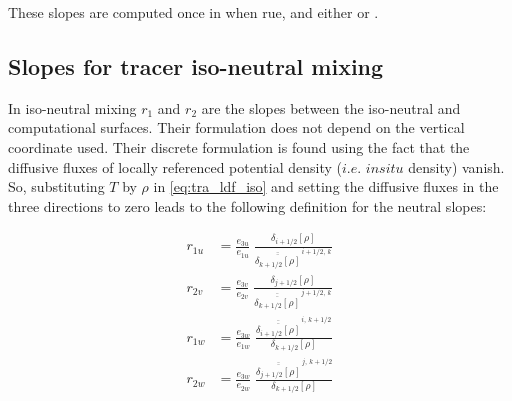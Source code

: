 \documentclass[../tex_main/NEMO_manual]{subfiles}
\begin{document}

These slopes are computed once in  when rue,
and either  or . 

\subsection{Slopes for tracer iso-neutral mixing}
\label{subsec:LDF_slp_iso}
In iso-neutral mixing  $r_1$ and $r_2$ are the slopes between the iso-neutral and computational surfaces.
Their formulation does not depend on the vertical coordinate used.
Their discrete formulation is found using the fact that the diffusive fluxes of
locally referenced potential density ($i.e.$ $in situ$ density) vanish.
So, substituting $T$ by $\rho$ in \autoref{eq:tra_ldf_iso} and setting the diffusive fluxes in
the three directions to zero leads to the following definition for the neutral slopes:

\begin{equation} \label{eq:ldfslp_iso}
\begin{split}
 r_{1u} &= \frac{e_{3u}}{e_{1u}}\; \frac{\delta_{i+1/2}[\rho]}
 								{\overline{\overline{\delta_{k+1/2}[\rho]}}^{\,i+1/2,\,k}}
\\
 r_{2v} &= \frac{e_{3v}}{e_{2v}}\; \frac{\delta_{j+1/2}\left[\rho \right]}
 								{\overline{\overline{\delta_{k+1/2}[\rho]}}^{\,j+1/2,\,k}}
\\
 r_{1w} &= \frac{e_{3w}}{e_{1w}}\; 
 			\frac{\overline{\overline{\delta_{i+1/2}[\rho]}}^{\,i,\,k+1/2}}
				 {\delta_{k+1/2}[\rho]}
\\
 r_{2w} &= \frac{e_{3w}}{e_{2w}}\; 
 			\frac{\overline{\overline{\delta_{j+1/2}[\rho]}}^{\,j,\,k+1/2}}
				 {\delta_{k+1/2}[\rho]}
\\
\end{split}
\end{equation}

\end{document}
